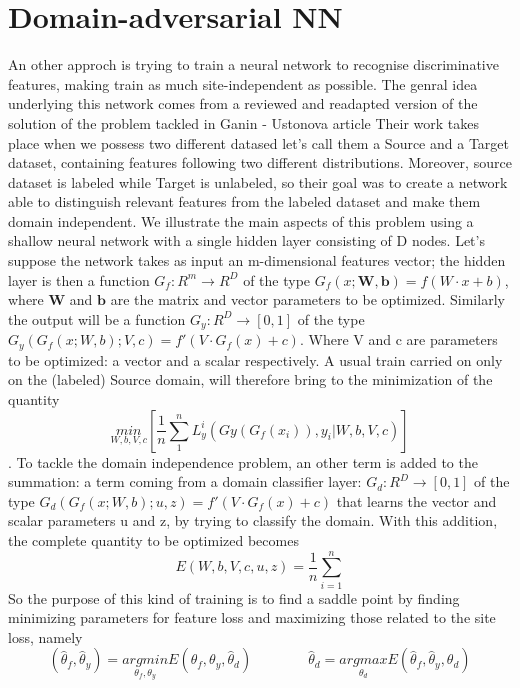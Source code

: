 \documentclass[a4paper,11pt]{article}
\begin{document}
\section{Domain-adversarial NN}
An other approch is trying to train a neural network to recognise discriminative features, making train as much site-independent as possible.
The genral idea underlying this network comes from a reviewed and readapted version of the solution of the problem tackled in Ganin - Ustonova article
Their work takes place when we possess two different datased let's call them a Source and a Target dataset, containing features following two different distributions.
Moreover, source dataset is labeled while Target is unlabeled, so their goal was to create a network able to distinguish relevant features from the labeled dataset and make them domain independent.
We illustrate the main aspects of this problem using a shallow neural network with a single hidden layer consisting of D nodes.
Let's suppose the network takes as input an m-dimensional features vector;
the hidden layer is then a function $G_f : R^m \rightarrow R^D$ of the type $G_f(x; \textbf{W}, \textbf{b}) = f(W\cdot x + b)$, where $\textbf{W}$ and $\textbf{b}$ are the matrix and vector parameters to be optimized.
Similarly the output will be a function $G_y:R^D \rightarrow [0, 1]$ of the type $G_y(G_f(x; W, b); V, c) = f'(V\cdot G_f(x) + c)$.
Where V and c are parameters to be optimized: a vector and a scalar respectively.
A usual train carried on only on the (labeled) Source domain, will therefore bring to the minimization of the quantity
\begin{equation}
\underset{W, b, V, c}{min} \left[ \frac{1}{n}\sum_1^n L_y^i(Gy(G_f(x_i)), y_i | W, b, V, c)\right]
\end{equation}.
To tackle the domain independence problem, an other term is added to the summation: a term coming from a domain classifier layer: $G_d:R^D \rightarrow [0, 1]$ of the type $G_d(G_f(x; W, b); u, z) = f'(V\cdot G_f(x) + c)$ that learns the vector and scalar parameters u and z, by trying to classify the domain.
With this addition, the complete quantity to be optimized becomes
\begin{equation}
E(W, b, V, c, u, z) = \frac{1}{n} \sum_{i = 1}^n
\end{equation}
So the purpose of this kind of training is to find a saddle point by finding minimizing parameters for feature loss and maximizing those related to the site loss, namely
\begin{equation}
(\hat \theta_f, \hat \theta_y) = \underset{\theta_f, \theta_y}{argmin} E(\theta_f, \theta_y, \hat \theta_d) \qquad \qquad \hat \theta_d = \underset{\theta_d}{argmax} E(\hat \theta_f, \hat \theta_y, \theta_d)
\end{equation}
\end{document}
